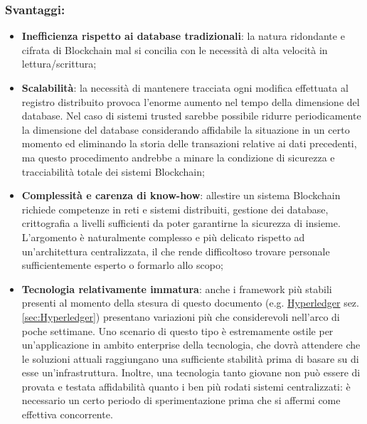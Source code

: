 		\subsubsection{Svantaggi:}
			\begin{itemize}
				\item \textbf{Inefficienza rispetto ai database tradizionali}: la natura ridondante e cifrata di Blockchain mal si concilia con le necessità di alta velocità in lettura/scrittura;
				\item \textbf{Scalabilità}: la necessità di mantenere tracciata ogni modifica effettuata al registro distribuito provoca l'enorme aumento nel tempo della dimensione del database. Nel caso di sistemi trusted sarebbe possibile ridurre periodicamente la dimensione del database considerando affidabile la situazione in un certo momento ed eliminando la storia delle transazioni relative ai dati precedenti, ma questo procedimento andrebbe a minare la condizione di sicurezza e tracciabilità totale dei sistemi Blockchain;
				\item \textbf{Complessità e carenza di know-how}: allestire un sistema Blockchain richiede competenze in reti e sistemi distribuiti, gestione dei database, crittografia a livelli sufficienti da poter garantirne la sicurezza di insieme. L'argomento è naturalmente complesso e più delicato rispetto ad un'architettura centralizzata, il che rende difficoltoso trovare personale sufficientemente esperto o formarlo allo scopo;
				\item \textbf{Tecnologia relativamente immatura}: anche i framework più stabili presenti al momento della stesura di questo documento (e.g. \hyperref[sec:Hyperledger]{Hyperledger} sez. \ref{sec:Hyperledger}) presentano variazioni più che considerevoli nell'arco di poche settimane. Uno scenario di questo tipo è estremamente ostile per un'applicazione in ambito enterprise della tecnologia, che dovrà attendere che le soluzioni attuali raggiungano una sufficiente stabilità prima di basare su di esse un'infrastruttura. Inoltre, una tecnologia tanto giovane non può essere di provata e testata affidabilità quanto i ben più rodati sistemi centralizzati: è necessario un certo periodo di sperimentazione prima che si affermi come effettiva concorrente.
			\end{itemize}
		
